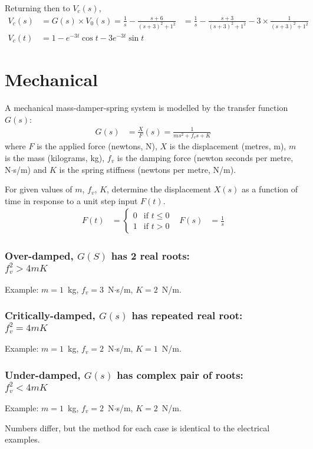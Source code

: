 \documentclass[a4paper,12pt]{article}
\begin{document}
Returning then to $V_c(s)$,
\begin{align*}
  V_c(s) &= G(s)\times V_0(s) = \frac{1}{s} - \frac{s+6}{(s+3)^2+1^2}
  & = \frac{1}{s} - \frac{s+3}{(s+3)^2+1^2} - 3\times \frac{1}{(s+3)^2+1^2} \\
  V_c(t) &= 1 - e^{-3t} \cos t - 3 e^{-3t} \sin t
\end{align*}

\newpage

\part{Mechanical}
A mechanical mass-damper-spring system is modelled by the transfer function $G(s)$:
\begin{align*}
  G(s) &= \frac{X}{F}(s) = \frac{1}{ms^2 + f_v s + K}
\end{align*}
where $F$ is the applied force (newtons, N), $X$ is the displacement (metres, m),
$m$ is the mass (kilograms, kg), $f_v$ is the damping force (newton seconds per metre, N$\cdot$s/m) and $K$ is the spring stiffness (newtons per metre, N/m).

For given values of $m$, $f_v$, $K$, determine the displacement $X(s)$ as a function of time in response to a unit step input $F(t)$.
\begin{align*}
  F(t) &= \begin{cases} 0 & \text{if } t \leq 0 \\ 1 & \text{if } t > 0 \end{cases} &
  F(s) &= \frac{1}{s}
\end{align*}

\section*{Over-damped, $G(S)$ has 2 real roots:\\ $f_v^2>4mK$}
Example: $m=1$~kg, $f_v=3$~N$\cdot$s/m, $K=2$~N/m. %
\section*{Critically-damped, $G(s)$ has repeated real root:\\$f_v^2=4mK$}
Example: $m=1$~kg, $f_v=2$~N$\cdot$s/m, $K=1$~N/m. %
\section*{Under-damped, $G(s)$ has complex pair of roots:\\$f_v^2<4mK$}
Example: $m=1$~kg, $f_v=2$~N$\cdot$s/m, $K=2$~N/m. %

Numbers differ, but the method for each case is identical to the electrical examples.
\end{document}
